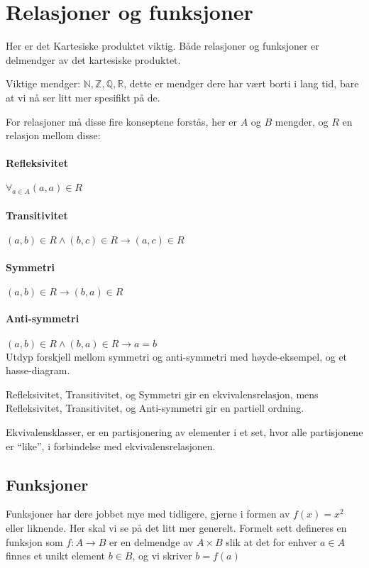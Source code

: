 \section{Relasjoner og funksjoner}

Her er det Kartesiske produktet viktig. Både relasjoner og funksjoner er delmendger av det
kartesiske produktet. 

Viktige mendger: $\mathbb{N}, \mathbb{Z}, \mathbb{Q}, \mathbb{R}$, dette er mendger dere har vært borti i lang tid, bare at vi nå ser litt mer spesifikt på de.

For relasjoner må disse fire konseptene forstås, her er $A$ og $B$ mengder, og $R$ en relasjon mellom disse:
\paragraph*{Refleksivitet} $\forall_{a\in A} (a,a)\in R$
\paragraph*{Transitivitet} $(a,b) \in R\land (b,c)\in R \to (a,c) \in R$
\paragraph*{Symmetri} $(a,b)\in R \to (b,a) \in R$
\paragraph*{Anti-symmetri} $(a,b) \in R \land (b,a)\in R \to a=b$\\

\noindent Utdyp forskjell mellom symmetri og anti-symmetri med høyde-eksempel, og et hasse-diagram.

Refleksivitet, Transitivitet, og Symmetri gir en ekvivalensrelasjon, mens Refleksivitet, Transitivitet, og Anti-symmetri gir en partiell ordning.

Ekvivalensklasser, er en partisjonering av elementer i et set, hvor alle partisjonene er \enquote{like}, i forbindelse med ekvivalensrelasjonen.

\subsection{Funksjoner}

Funksjoner har dere jobbet mye med tidligere, gjerne i formen av $f(x) = x^2$ eller liknende. Her skal vi se på det litt mer generelt.
Formelt sett defineres en funksjon som $f:A\to B$ er en delmendge av $A \times B$ slik at det for enhver $a\in A$
finnes et unikt element $b\in B$, og vi skriver $b=f(a)$

